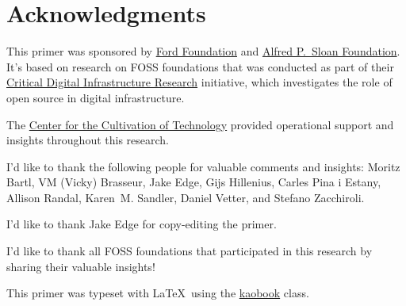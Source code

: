 


\chapter{Acknowledgments}

This primer was sponsored by \href{https://www.fordfoundation.org/}{Ford Foundation} and \href{https://sloan.org/}{Alfred P.\ Sloan Foundation}.  It's based on research on FOSS foundations that was conducted as part of their \href{https://www.fordfoundation.org/campaigns/critical-digital-infrastructure-research/}{Critical Digital Infrastructure Research} initiative, which investigates the role of open source in digital infrastructure.

The \href{https://techcultivation.org/}{Center for the Cultivation of Technology} provided operational support and insights throughout this research.

I'd like to thank the following people for valuable comments and insights: Moritz Bartl, VM (Vicky) Brasseur, Jake Edge, Gijs Hillenius, Carles Pina i Estany, Allison Randal, Karen~M. Sandler, Daniel Vetter, and Stefano Zacchiroli.

I'd like to thank Jake Edge for copy-editing the primer.

I'd like to thank all FOSS foundations that participated in this research by sharing their valuable insights!

This primer was typeset with \LaTeX\ using the \href{https://github.com/fmarotta/kaobook}{kaobook} class.

